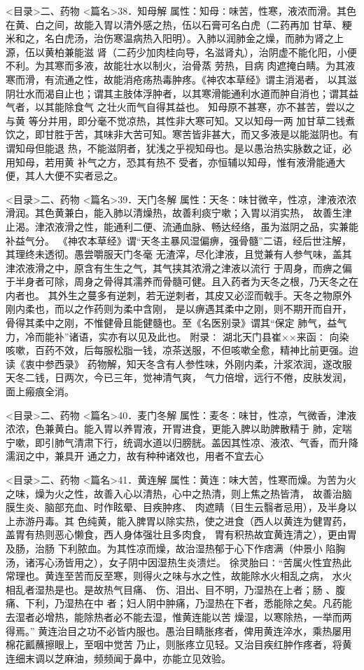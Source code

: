 \documentclass[a4paper,12pt,UTF8,twoside]{ctexbook}
\begin{document}
<目录>二、药物
<篇名>38．知母解
属性：知母∶味苦，性寒，液浓而滑。其色在黄、白之间，故能入胃以清外感之热，伍以石膏可名白虎（二药再加 
甘草、粳米和之，名白虎汤，治伤寒温病热入阳明）。入肺以润肺金之燥，而肺为肾之上源，伍以黄柏兼能滋 
肾（二药少加肉桂向导，名滋肾丸），治阴虚不能化阳，小便不利。为其寒而多液，故能壮水以制火，治骨蒸 
劳热，目病 肉遮掩白睛。为其液寒而滑，有流通之性，故能消疮疡热毒肿疼。《神农本草经》谓主消渴者， 
以其滋阴壮水而渴自止也；谓其主肢体浮肿者，以其寒滑能通利水道而肿自消也；谓其益气者，以其能除食气 
之壮火而气自得其益也。 
知母原不甚寒，亦不甚苦，尝以之与黄 等分并用，即分毫不觉凉热，其性非大寒可知。又以知母一两 
加甘草二钱煮饮之，即甘胜于苦，其味非大苦可知。寒苦皆非甚大，而又多液是以能滋阴也。有谓知母但能退 
热，不能滋阴者，犹浅之乎视知母也。是以愚治热实脉数之证，必用知母，若用黄 补气之方，恐其有热不 
受者，亦恒辅以知母，惟有液滑能通大便，其人大便不实者忌之。 

<目录>二、药物
<篇名>39．天门冬解
属性：天冬∶味甘微辛，性凉，津液浓浓滑润。其色黄兼白，能入肺以清燥热，故善利痰宁嗽；入胃以消实热， 
故善生津止渴。津浓液滑之性，能通利二便、流通血脉、畅达经络，虽为滋阴之品，实兼能补益气分。 
《神农本草经》谓“天冬主暴风湿偏痹，强骨髓”二语，经后世注解，其理终未透彻。愚尝嚼服天门冬毫 
无渣滓，尽化津液，且觉兼有人参气味，盖其津浓液滑之中，原含有生生之气，其气挟其浓滑之津液以流行 
于周身，而痹之偏于半身者可除，周身之骨得其濡养而骨髓可健。且入药者为天冬之根，乃天冬之在内者也。 
其外生之蔓多有逆刺，若无逆刺者，其皮又必涩而戟手。天冬之物原外刚内柔也，而以之作药则为柔中含刚， 
是以痹遇其柔中之刚，则不期开而自开，骨得其柔中之刚，不惟健骨且能健髓也。至《名医别录》谓其“保定 
肺气，益气力，冷而能补”诸语，实亦有以见及此也。 
附录∶ 
湖北天门县崔××来函∶ 
向染咳嗽，百药不效，后每服松脂一钱，凉茶送服，不但咳嗽全愈，精神比前更强。迨读《衷中参西录》 
药物解，知天冬含有人参性味，外刚内柔，汁浆浓润，遂改服天冬二钱，日两次，今已三年，觉神清气爽， 
气力倍增，远行不倦，皮肤发润，面上瘢痕全消。 

<目录>二、药物
<篇名>40．麦门冬解
属性：麦冬∶味甘，性凉，气微香，津液浓浓，色兼黄白。能入胃以养胃液，开胃进食，更能入脾以助脾散精于 
肺，定喘宁嗽，即引肺气清肃下行，统调水道以归膀胱。盖因其性凉、液浓、气香，而升降濡润之中，兼具开 
通之力，故有种种诸效也，用者不宜去心 

<目录>二、药物
<篇名>41．黄连解
属性：黄连∶味大苦，性寒而燥。为苦为火之味，燥为火之性，故善入心以清热，心中之热清，则上焦之热皆清， 
故善治脑膜生炎、脑部充血、时作眩晕、目疾肿疼、 肉遮睛（目生云翳者忌用），及半身以上赤游丹毒。其 
色纯黄，能入脾胃以除实热，使之进食（西人以黄连为健胃药，盖胃有热则恶心懒食，西人身体强壮且多肉食， 
胃有积热故宜黄连清之），更由胃及肠，治肠 下利脓血。为其性凉而燥，故治湿热郁于心下作痞满（仲景小 
陷胸汤，诸泻心汤皆用之），女子阴中因湿热生炎溃烂。 
徐灵胎曰∶“苦属火性宜热此常理也。黄连至苦而反至寒，则得火之味与水之性，故能除水火相乱之病， 
水火相乱者湿热是也。是故热气目痛、 伤、泪出、目不明，乃湿热在上者；肠 、腹痛、下利，乃湿热在中 
者；妇人阴中肿痛，乃湿热在下者，悉能除之矣。凡药能去湿者必增热，能除热者必不能去湿，惟黄连能以苦 
燥湿，以寒除热，一举而两得焉。” 
黄连治目之功不必皆内服也。愚治目睛胀疼者，俾用黄连淬水，乘热屡用棉花瓤蘸擦眼上，至咽中觉苦 
乃止，则胀疼立见轻。又治目疾红肿作疼者，将黄连细末调以芝麻油，频频闻于鼻中，亦能立见效验。 
\end{document}
